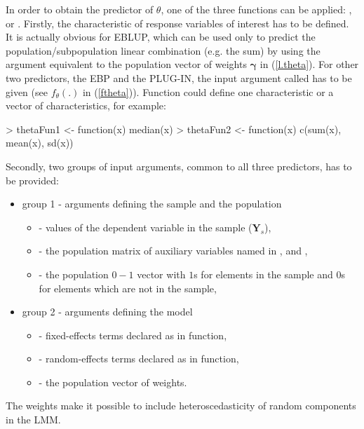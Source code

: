 In order to obtain the predictor of $\theta$, one of the three  functions can be applied: ,  or . Firstly, the characteristic of response variables of interest has to be defined. It is actually obvious for EBLUP, which can be used only to predict the population/subpopulation linear combination (e.g. the sum) by using the argument  equivalent to the population vector of weights $\boldsymbol{\gamma}$ in (\ref{l.theta}). For other two predictors, the EBP and the PLUG-IN, the input argument called  has to be given (see $f_{\theta}(.)$ in (\ref{ftheta})). Function  could define one characteristic or a vector of characteristics, for example:

\begin{example}
> thetaFun1 <- function(x) median(x)
> thetaFun2 <- function(x) c(sum(x), mean(x), sd(x))
\end{example}


Secondly, two groups of input arguments, common to all three predictors, has to be provided:
\begin{itemize}
	\item {group 1 - arguments defining the sample and the population}
	\begin{itemize}
		\item   {} - values of the dependent variable in the sample ($\mathbf{Y}_s$),
		\item	{} - the population matrix of auxiliary variables named in ,  and ,
		\item	{} - the population $0-1$ vector with $1$s for elements in the sample and $0$s for elements which are not in the sample,
	\end{itemize}
	\item {group 2 - arguments defining the model}
	\begin{itemize}
		\item	{} - fixed-effects terms declared as in  function,
        \item {} - random-effects terms declared as in  function,
		\item	{} - the population vector of weights.
	\end{itemize}
\end{itemize}
The weights make it possible to include heteroscedasticity of random components in the LMM.
		
